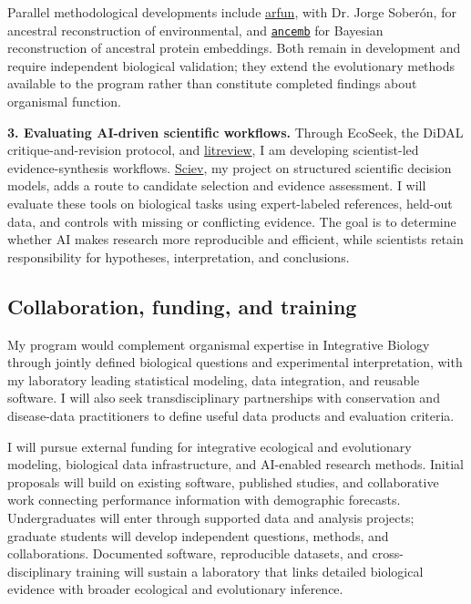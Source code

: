 \documentclass[11pt,letterpaper]{article}
\begin{document}
Parallel methodological developments include
\href{https://alrobles.github.io/arfun/}{arfun}, with Dr. Jorge Sober\'on, for ancestral reconstruction of environmental, and 
\href{https:/https://github.com/alrobles/ancemb/}
\texttt{ancemb} for Bayesian reconstruction of ancestral protein embeddings. Both remain in development and require independent biological validation; they extend the evolutionary methods available to the program rather than constitute completed findings about organismal function.

\textbf{3. Evaluating AI-driven scientific workflows.}
Through EcoSeek, the DiDAL critique-and-revision protocol, and \href{https://litreview.org}{litreview}, I am developing scientist-led evidence-synthesis workflows. \href{https://sciev.org}{Sciev}, my project on structured scientific decision models, adds a route to candidate selection and evidence assessment. I will evaluate these tools on biological tasks using expert-labeled references, held-out data, and controls with missing or conflicting evidence. The goal is to determine whether AI makes research more reproducible and efficient, while scientists retain responsibility for hypotheses, interpretation, and conclusions.

\subsection*{Collaboration, funding, and training}
My program would complement organismal expertise in Integrative Biology through jointly defined biological questions and experimental interpretation, with my laboratory leading statistical modeling, data integration, and reusable software. I will also seek transdisciplinary partnerships with conservation and disease-data practitioners to define useful data products and evaluation criteria.

I will pursue external funding for integrative ecological and evolutionary modeling, biological data infrastructure, and AI-enabled research methods. Initial proposals will build on existing software, published studies, and collaborative work connecting performance information with demographic forecasts. Undergraduates will enter through supported data and analysis projects; graduate students will develop independent questions, methods, and collaborations. Documented software, reproducible datasets, and cross-disciplinary training will sustain a laboratory that links detailed biological evidence with broader ecological and evolutionary inference.
\end{document}
